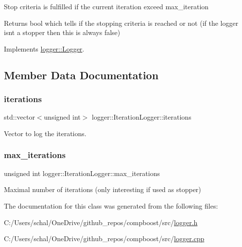 Stop criteria is fulfilled if the current iteration exceed {\ttfamily max\+\_\+iteration} 

\begin{DoxyReturn}{Returns}
{\ttfamily bool} which tells if the stopping criteria is reached or not (if the logger isn\textquotesingle{}t a stopper then this is always false) 
\end{DoxyReturn}


Implements \mbox{\hyperlink{classlogger_1_1_logger_aed91421c07062b91cee158ef2bda7ae8}{logger\+::\+Logger}}.



\subsection{Member Data Documentation}
\mbox{\label{classlogger_1_1_iteration_logger_a7c9d7b0bd792a93a6dd5d9601a10a9b4}} 
\subsubsection{\texorpdfstring{iterations}{iterations}}
{\footnotesize\ttfamily std\+::vector$<$unsigned int$>$ logger\+::\+Iteration\+Logger\+::iterations\hspace{0.3cm}{\ttfamily [private]}}



Vector to log the iterations. 

\mbox{\label{classlogger_1_1_iteration_logger_a3fe389ce81d0790729b59b96414a3909}} 
\subsubsection{\texorpdfstring{max\+\_\+iterations}{max\_iterations}}
{\footnotesize\ttfamily unsigned int logger\+::\+Iteration\+Logger\+::max\+\_\+iterations\hspace{0.3cm}{\ttfamily [private]}}



Maximal number of iterations (only interesting if used as stopper) 



The documentation for this class was generated from the following files\+:\begin{DoxyCompactItemize}
\item 
C\+:/\+Users/schal/\+One\+Drive/github\+\_\+repos/compboost/src/\mbox{\hyperlink{logger_8h}{logger.\+h}}\item 
C\+:/\+Users/schal/\+One\+Drive/github\+\_\+repos/compboost/src/\mbox{\hyperlink{logger_8cpp}{logger.\+cpp}}\end{DoxyCompactItemize}
